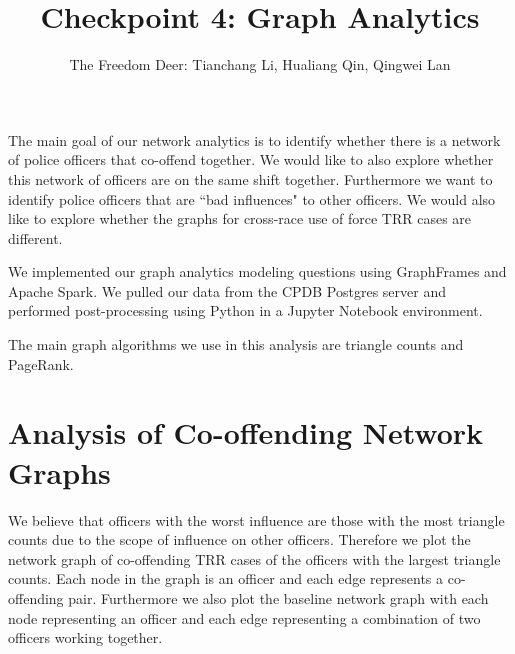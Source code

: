 \documentclass[10pt]{article}
\title{Checkpoint 4: Graph Analytics}
\author{The Freedom Deer: Tianchang Li, Hualiang Qin, Qingwei Lan}
\begin{document}
\maketitle


The main goal of our network analytics is to identify whether there is a network of police officers that co-offend together. We would like to also explore whether this network of officers are on the same shift together. Furthermore we want to identify police officers that are ``bad influences" to other officers. We would also like to explore whether the graphs for cross-race use of force TRR cases are different.

We implemented our graph analytics modeling questions using GraphFrames and Apache Spark. We pulled our data from the CPDB Postgres server and performed post-processing using Python in a Jupyter Notebook environment. 

The main graph algorithms we use in this analysis are triangle counts and PageRank.


\section{Analysis of Co-offending Network Graphs}

We believe that officers with the worst influence are those with the most triangle counts due to the scope of influence on other officers. Therefore we plot the network graph of co-offending TRR cases of the officers with the largest triangle counts. Each node in the graph is an officer and each edge represents a co-offending pair. Furthermore we also plot the baseline network graph with each node representing an officer and each edge representing a combination of two officers working together.
\end{document}
